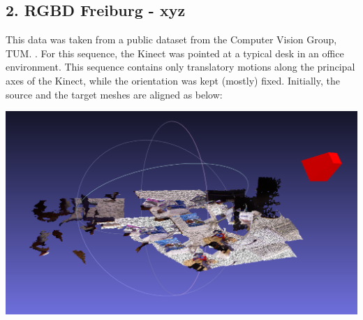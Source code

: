 \documentclass[a4paper,pagesize 10pt]{scrartcl}
\begin{document}
\subsection*{2. RGBD Freiburg - xyz}
This data was taken from a public dataset from the Computer Vision Group, TUM. \cite{Frei}. For this sequence, the Kinect was pointed at a typical desk in an office environment. This sequence contains only translatory motions along the principal axes of the Kinect, while the orientation was kept (mostly) fixed. Initially, the source and the target meshes are aligned as below:
\begin{center}
    \includegraphics[scale=0.16]{ICP_analysis_room_data.png}
\end{center}
\end{document}
